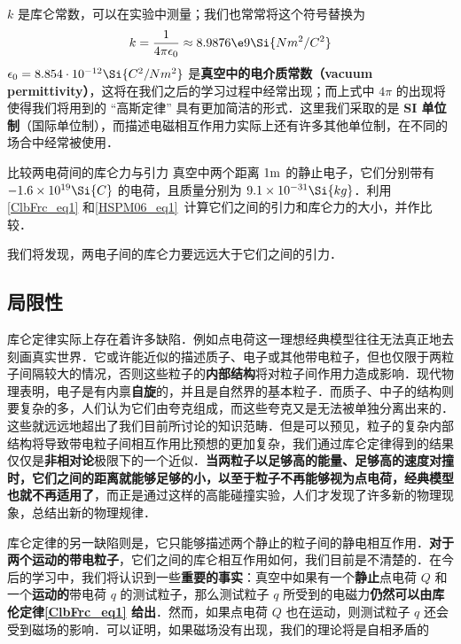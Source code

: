 $k$ 是库仑常数，可以在实验中测量；我们也常常将这个符号替换为
\begin{equation}
k = \frac{1}{4\pi\epsilon_0} \approx 8.9876\e9 \Si{N m^2/C^2}
\end{equation}
$\epsilon_0=8.854\cdot 10^{-12} \Si{C^2/Nm^2}$ 是\textbf{真空中的电介质常数（vacuum permittivity）}，这将在我们之后的学习过程中经常出现；而上式中 $4\pi$ 的出现将使得我们将用到的 “高斯定律” 具有更加简洁的形式．这里我们采取的是\textbf{ SI 单位制}（国际单位制），而描述电磁相互作用力实际上还有许多其他单位制，在不同的场合中经常被使用．

\begin{exercise}{比较两电荷间的库仑力与引力}
真空中两个距离 $1 \rm m$ 的静止电子，它们分别带有 $-1.6\times 10^{19} \Si{C}$ 的电荷，且质量分别为 $9.1\times 10^{-31} \Si{kg}$．利用\autoref{ClbFrc_eq1} 和\autoref{HSPM06_eq1}~计算它们之间的引力和库仑力的大小，并作比较．
\end{exercise}
我们将发现，两电子间的库仑力要远远大于它们之间的引力．
\subsection{局限性}
库仑定律实际上存在着许多缺陷．例如点电荷这一理想经典模型往往无法真正地去刻画真实世界．它或许能近似的描述质子、电子或其他带电粒子，但也仅限于两粒子间隔较大的情况，否则这些粒子的\textbf{内部结构}将对粒子间作用力造成影响．现代物理表明，电子是有内禀\textbf{自旋}的，并且是自然界的基本粒子．而质子、中子的结构则要复杂的多，人们认为它们由夸克组成，而这些夸克又是无法被单独分离出来的．这些就远远地超出了我们目前所讨论的知识范畴．但是可以预见，粒子的复杂内部结构将导致带电粒子间相互作用比预想的更加复杂，我们通过库仑定律得到的结果仅仅是\textbf{非相对论}极限下的一个近似．\textbf{当两粒子以足够高的能量、足够高的速度对撞时，它们之间的距离就能够足够的小，以至于粒子不再能够视为点电荷，经典模型也就不再适用了}，而正是通过这样的高能碰撞实验，人们才发现了许多新的物理现象，总结出新的物理规律．

库仑定律的另一缺陷则是，它只能够描述两个静止的粒子间的静电相互作用．\textbf{对于两个运动的带电粒子}，它们之间的库仑相互作用如何，我们目前是不清楚的．在今后的学习中，我们将认识到一些\textbf{重要的事实}：真空中如果有一个\textbf{静止}点电荷 $Q$ 和一个\textbf{运动的}带电荷 $q$ 的测试粒子，那么测试粒子 $q$ 所受到的电磁力\textbf{仍然可以由库伦定律\autoref{ClbFrc_eq1} 给出}．然而，如果点电荷 $Q$ 也在运动，则测试粒子 $q$ 还会受到磁场的影响．可以证明，如果磁场没有出现，我们的理论将是自相矛盾的